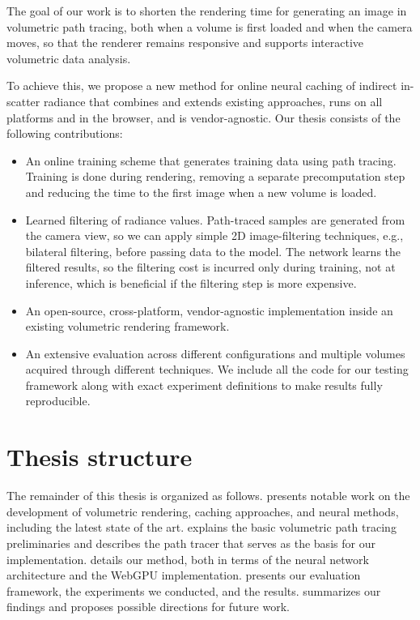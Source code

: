 The goal of our work is to shorten the rendering time for generating an image
in volumetric path tracing, both when a volume is first loaded and when the
camera moves, so that the renderer remains responsive and supports interactive
volumetric data analysis.

To achieve this, we propose a new method for online neural caching of indirect
in-scatter radiance that combines and extends existing approaches, runs
on all platforms and in the browser, and is vendor-agnostic. Our thesis
consists of the following contributions:
\begin{itemize}
    \item An online training scheme that generates training data using path
    tracing. Training is done during rendering, removing a separate
    precomputation step and reducing the time to the first image when a new
    volume is loaded.

    \item Learned filtering of radiance values. Path-traced samples are
    generated from the camera view, so we can apply simple 2D image-filtering
    techniques, e.g., bilateral filtering, before passing data to the model.
    The network learns the filtered results, so the filtering cost is incurred
    only during training, not at inference, which is beneficial if the filtering
    step is more expensive.

    \item An open-source, cross-platform, vendor-agnostic implementation
    inside an existing volumetric rendering framework.

    \item An extensive evaluation across different configurations and multiple
    volumes acquired through different techniques. We include all the code for
    our testing framework along with exact experiment definitions to make
    results fully reproducible.
\end{itemize}

\section{Thesis structure}

The remainder of this thesis is organized as follows.
 presents notable work on the development of
volumetric rendering, caching approaches, and neural methods, including the latest state of the art.
 explains the basic volumetric path tracing preliminaries and
describes the path tracer that serves as the basis for our implementation.
 details our method, both in terms of the
neural network architecture and the WebGPU implementation.
 presents our evaluation framework, the experiments
we conducted, and the results.
 summarizes our findings and proposes possible directions
for future work.